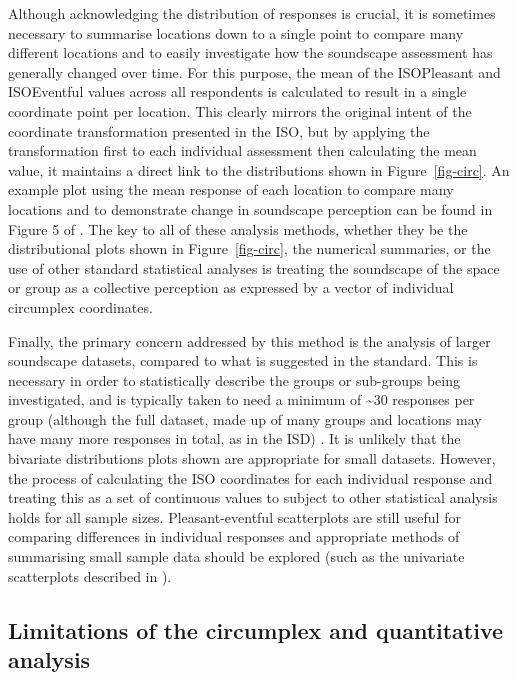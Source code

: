 \documentclass[
  authoryear,
  preprint,
  3p]{elsarticle}
\begin{document}
Although acknowledging the distribution of responses is crucial, it is
sometimes necessary to summarise locations down to a single point to
compare many different locations and to easily investigate how the
soundscape assessment has generally changed over time. For this purpose,
the mean of the ISOPleasant and ISOEventful values across all
respondents is calculated to result in a single coordinate point per
location. This clearly mirrors the original intent of the coordinate
transformation presented in the ISO, but by applying the transformation
first to each individual assessment then calculating the mean value, it
maintains a direct link to the distributions shown in
Figure~\ref{fig-circ}. An example plot using the mean response of each
location to compare many locations and to demonstrate change in
soundscape perception can be found in Figure 5 of
\citet{Mitchell2021Investigating}. The key to all of these analysis
methods, whether they be the distributional plots shown in
Figure~\ref{fig-circ}, the numerical summaries, or the use of other
standard statistical analyses is treating the soundscape of the space or
group as a collective perception as expressed by a vector of individual
circumplex coordinates.

Finally, the primary concern addressed by this method is the analysis of
larger soundscape datasets, compared to what is suggested in the
standard. This is necessary in order to statistically describe the
groups or sub-groups being investigated, and is typically taken to need
a minimum of \textasciitilde30 responses per group (although the full
dataset, made up of many groups and locations may have many more
responses in total, as in the ISD)
\citep[e.g.][]{Hong2015Influence, PuyanaRomero2016Modelling}. It is
unlikely that the bivariate distributions plots shown are appropriate
for small datasets. However, the process of calculating the ISO
coordinates for each individual response and treating this as a set of
continuous values to subject to other statistical analysis holds for all
sample sizes. Pleasant-eventful scatterplots are still useful for
comparing differences in individual responses and appropriate methods of
summarising small sample data should be explored (such as the univariate
scatterplots described in \citet{Weissgerber2015Bar}).

\subsection{Limitations of the circumplex and quantitative
analysis}\label{limitations-of-the-circumplex-and-quantitative-analysis}
\end{document}
